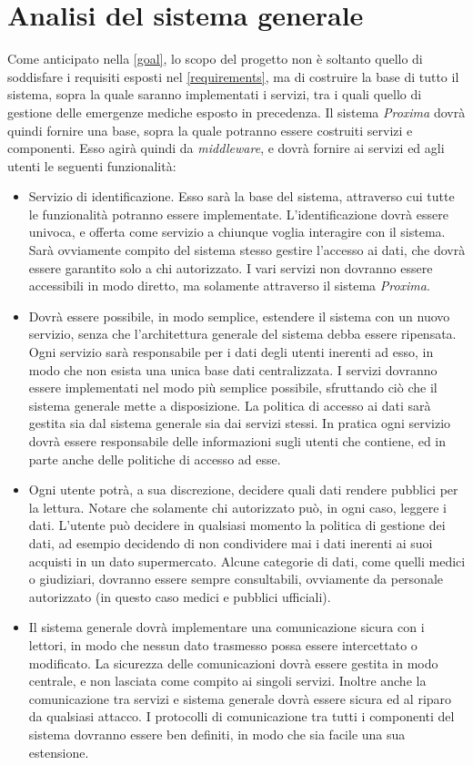 \documentclass[a4paper,12pt]{report}
\begin{document}
\section{Analisi del sistema generale}
Come anticipato nella \autoref{goal}, lo scopo del progetto non è soltanto quello di soddisfare i requisiti esposti nel \autoref{requirements}, ma di costruire la base di tutto il sistema, sopra la quale saranno implementati i servizi, tra i quali quello di gestione delle emergenze mediche esposto in precedenza. Il sistema \emph{Proxima} dovrà quindi fornire una base, sopra la quale potranno essere costruiti servizi e componenti. Esso agirà quindi da \emph{middleware}, e dovrà fornire ai servizi ed agli utenti le seguenti funzionalità:
\begin{itemize}
	\item Servizio di identificazione. Esso sarà la base del sistema, attraverso cui tutte le funzionalità potranno essere implementate. L'identificazione dovrà essere univoca, e offerta come servizio a chiunque voglia interagire con il sistema. Sarà ovviamente compito del sistema stesso gestire l'accesso ai dati, che dovrà essere garantito solo a chi autorizzato. I vari servizi non dovranno essere accessibili in modo diretto, ma solamente attraverso il sistema \emph{Proxima}.
	\item Dovrà essere possibile, in modo semplice, estendere il sistema con un nuovo servizio, senza che l'architettura generale del sistema debba essere ripensata. Ogni servizio sarà responsabile per i dati degli utenti inerenti ad esso, in modo che non esista una unica base dati centralizzata. I servizi dovranno essere implementati nel modo più semplice possibile, sfruttando ciò che il sistema generale mette a disposizione. La politica di accesso ai dati sarà gestita sia dal sistema generale sia dai servizi stessi. In pratica ogni servizio dovrà essere responsabile delle informazioni sugli utenti che contiene, ed in parte anche delle politiche di accesso ad esse.
	\item Ogni utente potrà, a sua discrezione, decidere quali dati rendere pubblici per la lettura. Notare che solamente chi autorizzato può, in ogni caso, leggere i dati. L'utente può decidere in qualsiasi momento la politica di gestione dei dati, ad esempio decidendo di non condividere mai i dati inerenti ai suoi acquisti in un dato supermercato. Alcune categorie di dati, come quelli medici o giudiziari, dovranno essere sempre consultabili, ovviamente da personale autorizzato (in questo caso medici e pubblici ufficiali).
	\item Il sistema generale dovrà implementare una comunicazione sicura con i lettori, in modo che nessun dato trasmesso possa essere intercettato o modificato. La sicurezza delle comunicazioni dovrà essere gestita in modo centrale, e non lasciata come compito ai singoli servizi. Inoltre anche la comunicazione tra servizi e sistema generale dovrà essere sicura ed al riparo da qualsiasi attacco. I protocolli di comunicazione tra tutti i componenti del sistema dovranno essere ben definiti, in modo che sia facile una sua estensione. 

\end{itemize}
\end{document}
